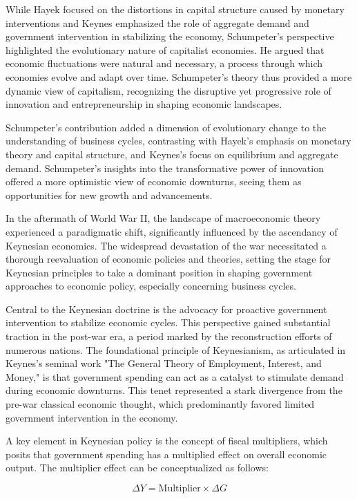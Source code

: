 \documentclass[12pt]{article}
\begin{document}
While Hayek focused on the distortions in capital structure caused by monetary interventions and Keynes emphasized the
role of aggregate demand and government intervention in stabilizing the economy, Schumpeter's perspective highlighted
the evolutionary nature of capitalist economies. He argued that economic fluctuations were natural and necessary, a
process through which economies evolve and adapt over time. Schumpeter's theory thus provided a more dynamic view of
capitalism, recognizing the disruptive yet progressive role of innovation and entrepreneurship in shaping economic
landscapes. 

Schumpeter's contribution added a dimension of evolutionary change to the understanding of business cycles,
contrasting with Hayek's emphasis on monetary theory and capital structure, and Keynes's focus on equilibrium and
aggregate demand. Schumpeter's insights into the transformative power of innovation offered a more optimistic view of
economic downturns, seeing them as opportunities for new growth and advancements. 
 
In the aftermath of World War II, the landscape of macroeconomic theory experienced a paradigmatic shift, significantly
influenced by the ascendancy of Keynesian economics. The widespread devastation of the war necessitated a thorough
reevaluation of economic policies and theories, setting the stage for Keynesian principles to take a dominant position
in shaping government approaches to economic policy, especially concerning business cycles. 

Central to the Keynesian doctrine is the advocacy for proactive government intervention to stabilize economic cycles.
This perspective gained substantial traction in the post-war era, a period marked by the reconstruction efforts of
numerous nations. The foundational principle of Keynesianism, as articulated in Keynes's seminal work "The General
Theory of Employment, Interest, and Money," \cite{key60}is that government spending can act as a catalyst to stimulate demand during
economic downturns. This tenet represented a stark divergence from the pre-war classical economic thought, which
predominantly favored limited government intervention in the economy. 

A key element in Keynesian policy is the concept of fiscal multipliers, which posits that government spending has a
multiplied effect on overall economic output. The multiplier effect can be conceptualized as follows: 

\[ \Delta Y = \text{Multiplier} \times \Delta G \]
\end{document}

